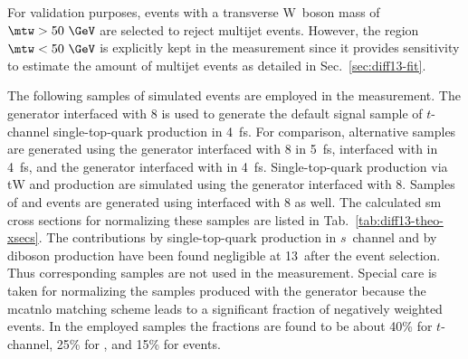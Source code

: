 For validation purposes, events with a transverse W~boson mass of $\mtw>50~\GeV$ are selected to reject multijet events. However, the region $\mtw<50~\GeV$ is explicitly kept in the measurement since it provides sensitivity to estimate the amount of multijet events as detailed in Sec.~\ref{sec:diff13-fit}.

The following samples of simulated events are employed in the measurement. The \MGAMC generator interfaced with \PYTHIA{}8 is used to generate the default signal sample of $t$-channel single-top-quark production in 4~\gls{fs}. For comparison, alternative samples are generated using the \MGAMC generator interfaced with \PYTHIA{}8 in 5~\gls{fs}, \MGAMC interfaced with \HERWIG in 4~\gls{fs}, and the \POWHEG generator interfaced with \PYTHIA in 4~\gls{fs}. Single-top-quark production via tW and \ttbar production are simulated using the \POWHEG generator interfaced with \PYTHIA{}8. Samples of \wjets and \zjets events are generated using \MGAMC interfaced with \PYTHIA{}8 as well. The calculated \gls{sm} cross sections for normalizing these samples are listed in Tab.~\ref{tab:diff13-theo-xsecs}. The contributions by single-top-quark production in $s$~channel and by diboson production have been found negligible at 13~\TeV after the event selection. Thus corresponding samples are not used in the measurement. Special care is taken for normalizing the samples produced with the \MGAMC generator because the \gls{mcatnlo} matching scheme leads to a significant fraction of negatively weighted events. In the employed samples the fractions are found to be about 40\% for $t$-channel, 25\% for \zjets, and 15\% for \wjets events.


